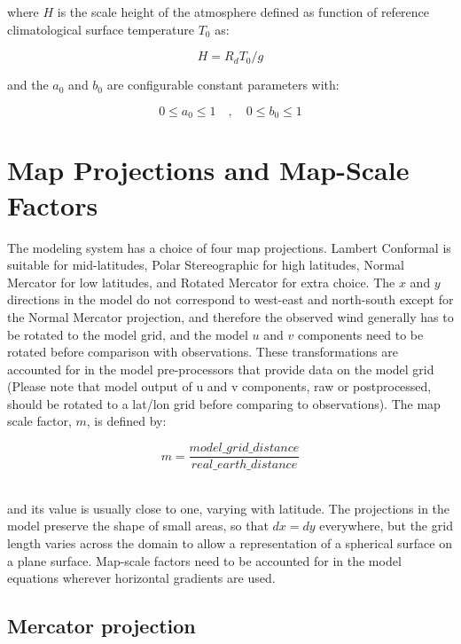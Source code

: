 where $H$ is the scale height of the atmosphere defined as function of
reference climatological surface temperature $T_0$ as:

\begin{equation}
H = R_d T_0 / g
\end{equation}

and the $a_0$ and $b_0$ are configurable constant parameters with:

\begin{equation}
0 \le a_0 \le 1 \quad , \quad 0 \le b_0 \le 1
\end{equation}

\section{Map Projections and Map-Scale Factors}
The modeling system has a
choice of four map projections. Lambert Conformal is suitable for mid-latitudes,
Polar Stereographic for high latitudes, Normal Mercator for low latitudes, and
Rotated Mercator for extra choice. The $x$ and $y$ directions in the model do
not correspond to west-east and north-south except for the Normal Mercator
projection, and therefore the observed wind generally has to be rotated to the
model grid, and the model $u$ and $v$ components need to be rotated before
comparison with observations. These transformations are accounted for in the
model pre-processors that provide data on the model grid (Please note that
model output of u and v components, raw or postprocessed, should be rotated to a
lat/lon grid before comparing to observations).  The map scale factor, $m$, is
defined by:

\begin{equation}
  m = \frac{model\_grid\_distance}{real\_earth\_distance}
\end{equation}

\noindent \\ and its value is usually close to one, varying with latitude. The
projections in the model preserve the shape of small areas, so that $dx=dy$
everywhere, but the grid length varies across the domain to allow a
representation of a spherical surface on a plane surface. Map-scale factors need
to be accounted for in the model equations wherever horizontal gradients are
used.

\subsection{Mercator projection}

